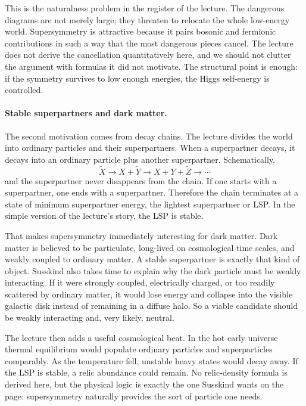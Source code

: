 This is the naturalness problem in the register of the lecture. The dangerous diagrams are not merely large; they threaten to relocate the whole low-energy world. Supersymmetry is attractive because it pairs bosonic and fermionic contributions in such a way that the most dangerous pieces cancel. The lecture does not derive the cancellation quantitatively here, and we should not clutter the argument with formulas it did not motivate. The structural point is enough: if the symmetry survives to low enough energies, the Higgs self-energy is controlled.

\paragraph{Stable superpartners and dark matter.}
The second motivation comes from decay chains. The lecture divides the world into ordinary particles and their superpartners. When a superpartner decays, it decays into an ordinary particle plus another superpartner. Schematically,
\begin{equation}
\tilde X \rightarrow X+\tilde Y \rightarrow X+Y+\tilde Z \rightarrow \cdots
\end{equation}
and the superpartner never disappears from the chain. If one starts with a superpartner, one ends with a superpartner. Therefore the chain terminates at a state of minimum superpartner energy, the lightest superpartner or LSP. In the simple version of the lecture's story, the LSP is stable.

That makes supersymmetry immediately interesting for dark matter. Dark matter is believed to be particulate, long-lived on cosmological time scales, and weakly coupled to ordinary matter. A stable superpartner is exactly that kind of object. Susskind also takes time to explain why the dark particle must be weakly interacting. If it were strongly coupled, electrically charged, or too readily scattered by ordinary matter, it would lose energy and collapse into the visible galactic disk instead of remaining in a diffuse halo. So a viable candidate should be weakly interacting and, very likely, neutral.

The lecture then adds a useful cosmological beat. In the hot early universe thermal equilibrium would populate ordinary particles and superparticles comparably. As the temperature fell, unstable heavy states would decay away. If the LSP is stable, a relic abundance could remain. No relic-density formula is derived here, but the physical logic is exactly the one Susskind wants on the page: supersymmetry naturally provides the sort of particle one needs.

